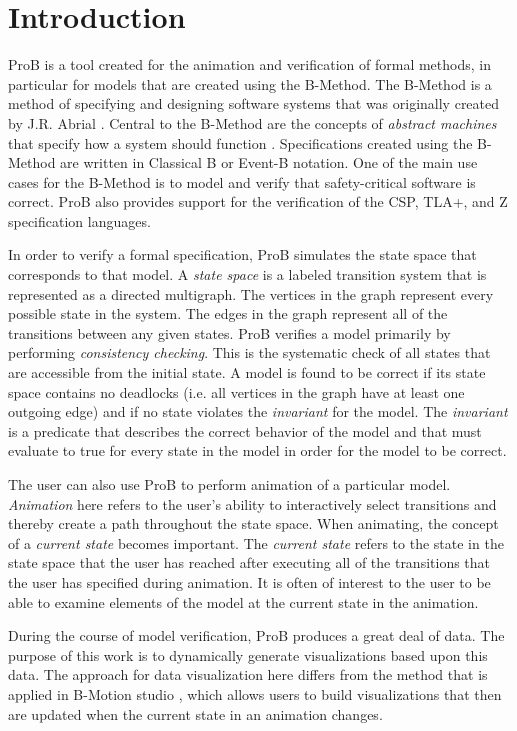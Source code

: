 \section{Introduction}

ProB is a tool created for the animation and verification of formal methods, in particular for models that are created using the B-Method. The B-Method is a method of specifying and designing software systems that was originally created by J.R. Abrial \cite{abrial2005b}. Central to the B-Method are the concepts of \emph{abstract machines} that specify how a system should function \cite{schneider2001b}. Specifications created using the B-Method are written in Classical B or Event-B notation. One of the main use cases for the B-Method is to model and verify that safety-critical software is correct. ProB also provides support for the verification of the CSP, TLA+, and Z specification languages.

In order to verify a formal specification, ProB simulates the state space that corresponds to that model. A \emph{state space} is a labeled transition system that is represented as a directed multigraph. The vertices in the graph represent every possible state in the system. The edges in the graph represent all of the transitions between any given states. ProB verifies a model primarily by performing \emph{consistency checking}. This is the systematic check of all states that are accessible from the initial state. A model is found to be correct if its state space contains no deadlocks (i.e. all vertices in the graph have at least one outgoing edge) and if no state violates the \emph{invariant} for the model. The \emph{invariant} is a predicate that describes the correct behavior of the model and that must evaluate to true for every state in the model in order for the model to be correct. 

The user can also use ProB to perform animation of a particular model. \emph{Animation} here refers to the user's ability to interactively select transitions and thereby create a path throughout the state space. When animating, the concept of a \emph{current state} becomes important. The \emph{current state} refers to the state in the state space that the user has reached after executing all of the transitions that the user has specified during animation. It is often of interest to the user to be able to examine elements of the model at the current state in the animation.

During the course of model verification, ProB produces a great deal of data. The purpose of this work is to dynamically generate visualizations based upon this data. The approach for data visualization here differs from the method that is applied in B-Motion studio \cite{LaBeLe09_258}, which allows users to build visualizations that then are updated when the current state in an animation changes.

